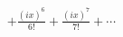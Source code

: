 \documentclass[preview]{standalone}
\begin{document}
\begin{align*}
+ \frac{(ix)^6}{6!} + \frac{(ix)^7}{7!} + \cdots
\end{align*}
\end{document}
